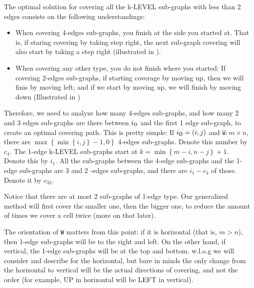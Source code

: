 \documentclass[a4paper,11pt]{article}
\theoremstyle{definition}
\newcommand{\opp}{{{\sf O}}\xspace}
\newcommand{\io}{{\ensuremath{i_{\opp}}}\xspace}
\newcommand{\w}{{{\texttt W}}\xspace}
\begin{document}
The optimal solution for covering all the k-LEVEL sub-graphs with less than 2 edges consists on the following understandings:
\begin{itemize}
    \item When covering 4-edges sub-graphs, you finish at the side you started at. That is, if staring covering by taking step right, the next sub-graph covering will also start by taking a step right (illustrated in ).
    \item When covering any other type, you do not finish where you started: If covering 2-edges sub-graphs, if starting coverage by moving up, then we will finis by moving left; and if we start by moving up, we will finish by moving down (Illustrated in )
\end{itemize}
Therefore, we need to analyze how many 4-edges sub-graphs, and how many 2 and 3 edges sub-graphs are there between \io and the first 1 edge sub-graph, to create an optimal covering path. This is pretty simple:
If $\io=\left(i,j\right)$ and $\w:m\times n$, there are $\max\left\{\min\left\{i,j\right\}-1,0\right\}$ 4-edges sub-graphs. Denote this number by $c_4$. 
The 1-edge k-LEVEL sub-graphs start at $k=\min\left\{m-i,n-j\right\}+1$. Denote this by $i_1$. All the sub-graphs between the 4-edge sub-graphs and the 1-edge sub-graphs are 3 and 2 -edges sub-graphs, and there are $i_1-c_4$ of those. Denote it by $c_{32}$.

Notice that there are at most 2 sub-graphs of 1-edge type. Our generalized method will first cover the smaller one, then the bigger one, to reduce the amount of times we cover a cell twice (more on that later).

The orientation of \w matters from this point: if it is horizontal (that is, $m>n$), then 1-edge sub-graphs will be to the right and left. On the other hand, if vertical, the 1-edge sub-graphs will be at the top and bottom. w.l.o.g we will consider and describe for the horizontal, but bare in minds the only change from the horizontal to vertical will be the actual directions of covering, and not the order (for example, UP in horizontal will be LEFT in vertical).
\end{document}
